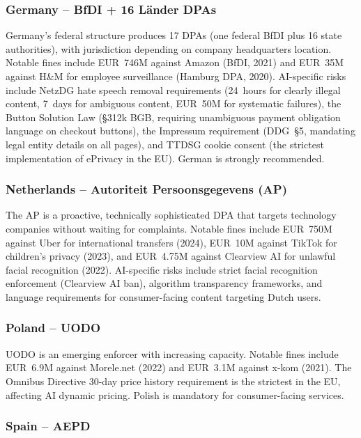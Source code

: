 \documentclass[11pt,a4paper]{article}
\begin{document}
\subsubsection{Germany -- BfDI + 16 L\"ander DPAs}

Germany's federal structure produces 17 DPAs (one federal BfDI plus 16 state authorities), with jurisdiction depending on company headquarters location. Notable fines include EUR~746M against Amazon (BfDI, 2021) and EUR~35M against H\&M for employee surveillance (Hamburg DPA, 2020). AI-specific risks include NetzDG hate speech removal requirements (24~hours for clearly illegal content, 7~days for ambiguous content, EUR~50M for systematic failures), the Button Solution Law (\S312k BGB, requiring unambiguous payment obligation language on checkout buttons), the Impressum requirement (DDG~\S5, mandating legal entity details on all pages), and TTDSG cookie consent (the strictest implementation of ePrivacy in the EU). German is strongly recommended.

\subsubsection{Netherlands -- Autoriteit Persoonsgegevens (AP)}

The AP is a proactive, technically sophisticated DPA that targets technology companies without waiting for complaints. Notable fines include EUR~750M against Uber for international transfers (2024), EUR~10M against TikTok for children's privacy (2023), and EUR~4.75M against Clearview AI for unlawful facial recognition (2022). AI-specific risks include strict facial recognition enforcement (Clearview AI ban), algorithm transparency frameworks, and language requirements for consumer-facing content targeting Dutch users.

\subsubsection{Poland -- UODO}

UODO is an emerging enforcer with increasing capacity. Notable fines include EUR~6.9M against Morele.net (2022) and EUR~3.1M against x-kom (2021). The Omnibus Directive 30-day price history requirement is the strictest in the EU, affecting AI dynamic pricing. Polish is mandatory for consumer-facing services.

\subsubsection{Spain -- AEPD}
\end{document}
